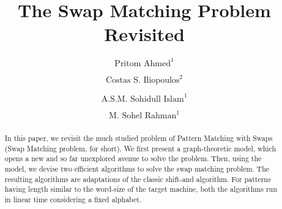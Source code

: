 \documentclass{llncs}
\begin{document}
\pagestyle{headings}


\pagestyle{headings}


\mainmatter

\title{The Swap Matching Problem Revisited}




\author{${\text{Pritom Ahmed}}^1$ \and ${\text{Costas S. Iliopoulos}}^2$ \and ${\text{A.S.M. Sohidull Islam}}^1$ \and ${\text{M. Sohel Rahman}}^1$}







\maketitle


\begin{abstract}
In this paper, we revisit the much studied problem of Pattern
Matching with Swaps (Swap Matching problem, for short). We first
present a graph-theoretic model, which
opens a new and so far unexplored avenue to solve the problem. Then,
using the model, we devise two efficient algorithms to solve the swap
matching problem. The resulting algorithms are adaptations of the
classic shift-and algorithm. For patterns having length similar to
the word-size of the target machine, both the algorithms run in linear time considering a fixed alphabet.
\end{abstract}

\end{document}
